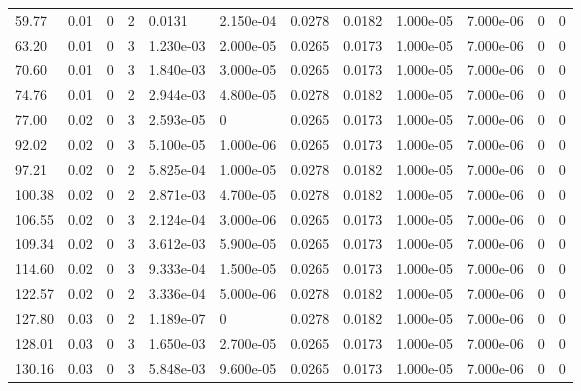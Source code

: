 \documentclass[preview]{standalone}
\begin{document}
{{\begin{tabular}{L{1.2cm}C{1.2cm} C{0.3cm}C{0.5cm} C{1.4cm}C{1.4cm} C{1.4cm}C{1.4cm} C{1.6cm}C{1.6cm} C{1.6cm}C{1.6cm}}
  59.77  &  0.01  & 0     &  2 &  0.0131  & 2.150e-04  &  0.0278&   0.0182& 1.000e-05 & 7.000e-06   &  0 & 0  \\ 
  63.20  &  0.01  & 0     &  3 &  1.230e-03  & 2.000e-05  &  0.0265&   0.0173& 1.000e-05 & 7.000e-06   &  0 & 0  \\ 
  70.60  &  0.01  & 0     &  3 &  1.840e-03  & 3.000e-05  &  0.0265&   0.0173& 1.000e-05 & 7.000e-06   &  0 & 0  \\ 
  74.76  &  0.01  & 0     &  2 &  2.944e-03  & 4.800e-05  &  0.0278&   0.0182& 1.000e-05 & 7.000e-06   &  0 & 0  \\ 
  77.00  &  0.02  & 0     &  3 &  2.593e-05  & 0  &  0.0265&   0.0173& 1.000e-05 & 7.000e-06   &  0 & 0  \\ 
  92.02  &  0.02  & 0     &  3 &  5.100e-05  & 1.000e-06  &  0.0265&   0.0173& 1.000e-05 & 7.000e-06   &  0 & 0  \\ 
  97.21  &  0.02  & 0     &  2 &  5.825e-04  & 1.000e-05  &  0.0278&   0.0182& 1.000e-05 & 7.000e-06   &  0 & 0  \\ 
  100.38  &  0.02  & 0     &  2 &  2.871e-03  & 4.700e-05  &  0.0278&   0.0182& 1.000e-05 & 7.000e-06   &  0 & 0  \\ 
  106.55  &  0.02  & 0     &  3 &  2.124e-04  & 3.000e-06  &  0.0265&   0.0173& 1.000e-05 & 7.000e-06   &  0 & 0  \\ 
  109.34  &  0.02  & 0     &  3 &  3.612e-03  & 5.900e-05  &  0.0265&   0.0173& 1.000e-05 & 7.000e-06   &  0 & 0  \\ 
  114.60  &  0.02  & 0     &  3 &  9.333e-04  & 1.500e-05  &  0.0265&   0.0173& 1.000e-05 & 7.000e-06   &  0 & 0  \\ 
  122.57  &  0.02  & 0     &  2 &  3.336e-04  & 5.000e-06  &  0.0278&   0.0182& 1.000e-05 & 7.000e-06   &  0 & 0  \\ 
  127.80  &  0.03  & 0     &  2 &  1.189e-07  & 0  &  0.0278&   0.0182& 1.000e-05 & 7.000e-06   &  0 & 0  \\ 
  128.01  &  0.03  & 0     &  3 &  1.650e-03  & 2.700e-05  &  0.0265&   0.0173& 1.000e-05 & 7.000e-06   &  0 & 0  \\ 
  130.16  &  0.03  & 0     &  3 &  5.848e-03  & 9.600e-05  &  0.0265&   0.0173& 1.000e-05 & 7.000e-06   &  0 & 0  \\ 
\hline 
\end{tabular} 

}}
\end{document}

